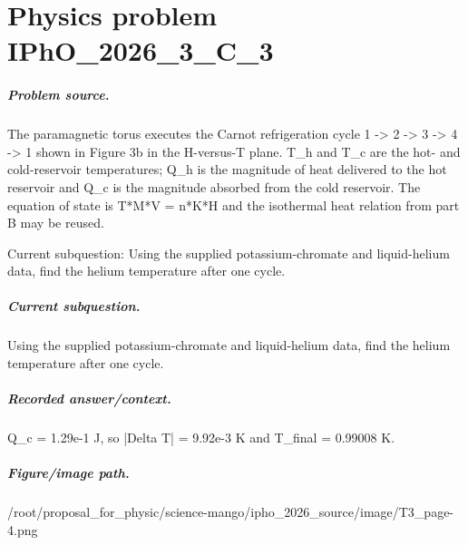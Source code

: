 
\chapter{Physics problem IPhO\_2026\_3\_C\_3}
\label{ch:IPhO2026Problems_problem_IPhO_2026_3_C_3}

\paragraph{Problem source.}
The paramagnetic torus executes the Carnot refrigeration cycle
1 -> 2 -> 3 -> 4 -> 1 shown in Figure 3b in the H-versus-T plane.  T\_h and T\_c
are the hot- and cold-reservoir temperatures; Q\_h is the magnitude of heat
delivered to the hot reservoir and Q\_c is the magnitude absorbed from the cold
reservoir.  The equation of state is T*M*V = n*K*H and the isothermal heat
relation from part B may be reused.

Current subquestion:
Using the supplied potassium-chromate and liquid-helium data, find the helium temperature after one cycle.

\paragraph{Current subquestion.}
Using the supplied potassium-chromate and liquid-helium data, find the helium temperature after one cycle.

\paragraph{Recorded answer/context.}
Q\_c = 1.29e-1 J, so |Delta T| = 9.92e-3 K and T\_final = 0.99008 K.

\paragraph{Figure/image path.}
/root/proposal\_for\_physic/science-mango/ipho\_2026\_source/image/T3\_page-4.png


